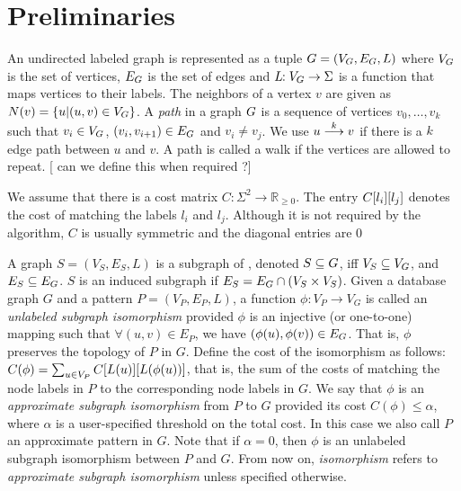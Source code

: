 \section{Preliminaries}

An undirected labeled graph \db is represented as a tuple $ \db =
(\vg,\eg,L) $ where $\vg$ is the set of vertices, $\eg$ is the set of
edges and $L\!\!: \vg \rightarrow \Sigma $ is a function that maps
vertices to their labels.  The neighbors of a vertex $v$ are given as $
N(v) = \{ u | (u,v) \in \vg \} $.  A
{\em path} in a graph $\db$ is a sequence of vertices $v_0,\ldots,v_k$
such that $v_i \in \vg$, $(v_i,v_{i+1}) \in \eg$ and $v_i \neq v_j$.
We use $\kpath{u}{v}{k}$ if there is a $k$ edge path
between $u$ and $v$.
A path is called a walk if the vertices
are allowed to repeat. [ can we define this when required ?]

\smallskip{}
We assume that there is a cost matrix 
$C\!\!:\Sigma^{2} \rightarrow \mathbb{R}_{\geq 0} $. 
The entry $\matij{C}{l_i}{l_j}$
denotes the cost of matching the labels $l_i$ and $l_j$. Although it is 
not required by the algorithm, $C$ is usually symmetric and the diagonal
entries are $0$

\smallskip{}
A graph $S = (V_S,E_S,L)$ is a subgraph of \db, denoted $S \subseteq
\db$, iff $V_S \subseteq \vg$, and $E_S \subseteq \eg$.  $S$ is an
induced subgraph if $E_S = \eg \cap (V_S \times V_S)$.  Given a database
graph $G$ and a pattern $P = (V_P,E_P,L)$, a function $\phi\!\!: V_P \to
V_G$ is called an {\em unlabeled subgraph isomorphism} provided $\phi$
is an injective (or one-to-one) mapping such that $\forall (u,v) \in
E_P$, we have $(\phi(u),\phi(v)) \in \eg$. That is, $\phi$ preserves the
topology of $P$ in $G$. Define the cost of the isomorphism as follows:
$C(\phi) = \sum_{u \in \vp} \matij{C}{L(u)}{L(\phi(u))}$, that is, the
sum of the costs of matching the node labels in $P$ to the corresponding
node labels in $G$.  We say that $\phi$ is an {\em approximate subgraph
isomorphism} from $P$ to $G$ provided its cost $C(\phi) \le \alpha$,
where $\alpha$ is a user-specified threshold on the total cost. In this
case we also call $P$ an approximate pattern in $G$. Note
that if $\alpha = 0$, then $\phi$ is an unlabeled subgraph isomorphism
between $P$ and $G$. From now on, \textit{isomorphism}
refers to \textit{approximate subgraph isomorphism} unless specified
otherwise.


